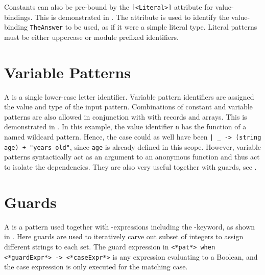 \documentclass[springer.tex]{subfiles}
\begin{document}
Constants can also be pre-bound by the \lstinline{[<Literal>]} attribute for value-bindings. This is demonstrated in .
%
%
The attribute is used to identify the value-binding \lstinline{TheAnswer} to be used, as if it were a simple literal type. Literal patterns must be either uppercase or module prefixed identifiers.

\section{Variable Patterns}
A  is a single lower-case letter identifier. Variable pattern identifiers are assigned the value and type of the input pattern. Combinations of constant and variable patterns are also allowed in conjunction with with records and arrays. This is demonstrated in .
%
%
In this example, the value identifier \lstinline{n} has the function of a named wildcard pattern. Hence, the case could as well have been \lstinline{| _ -> (string age) + "years old"}, since \lstinline{age} is already defined in this scope. However, variable patterns syntactically act as an argument to an anonymous function and thus act to isolate the dependencies. They are also very useful together with guards, see .

\section{Guards}
\label{sec:guards}
A  is a pattern used together with -expressions including the -keyword, as shown in . 
%
%
Here guards are used to iteratively carve out subset of integers to assign different strings to each set. The guard expression in \lstinline[language=syntax]{<*pat*> when <*guardExpr*> -> <*caseExpr*>} is any expression evaluating to a Boolean, and the case expression is only executed for the matching case.
\end{document}
